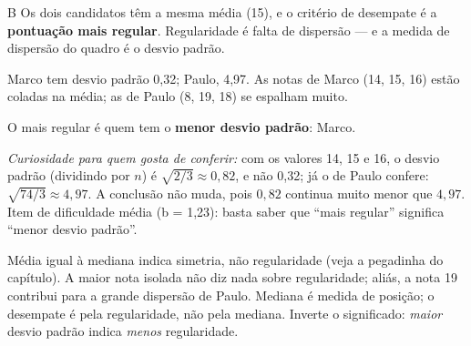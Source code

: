 \secaoenem

\begin{resolucao}{B}
 Os dois candidatos têm a mesma média (15), e o critério de desempate
é a \textbf{pontuação mais regular}. Regularidade é falta de dispersão — e a medida de dispersão do
quadro é o desvio padrão.

 Marco tem desvio padrão 0,32; Paulo, 4,97. As notas de Marco (14, 15, 16) estão
coladas na média; as de Paulo (8, 19, 18) se espalham muito.

 O mais regular é quem tem o \textbf{menor desvio padrão}: Marco.


\textit{Curiosidade para quem gosta de conferir:} com os valores 14, 15 e 16, o desvio padrão
(dividindo por $n$) é $\sqrt{2/3} \approx 0{,}82$, e não 0,32; já o de Paulo confere:
$\sqrt{74/3} \approx 4{,}97$. A conclusão não muda, pois $0{,}82$ continua muito menor que $4{,}97$.
Item de dificuldade média (b = 1,23): basta saber que “mais regular” significa “menor desvio padrão”.

\begin{distratores}
 Média igual à mediana indica simetria, não regularidade (veja a pegadinha do capítulo).
 A maior nota isolada não diz nada sobre regularidade; aliás, a nota 19 contribui para a
grande dispersão de Paulo.
 Mediana é medida de posição; o desempate é pela regularidade, não pela mediana.
 Inverte o significado: \emph{maior} desvio padrão indica \emph{menos} regularidade.
\end{distratores}
\end{resolucao}

